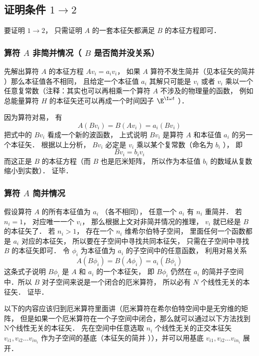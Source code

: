 \subsection{证明条件 $1 \to 2$}
要证明 $1 \to 2$，  只需证明 $A$ 的一套本征矢都满足 $B$ 的本征方程即可．

\subsubsection{算符 $A$ 非简并情况（ $B$ 是否简并没关系）}
先解出算符 $A$ 的本征方程 $A v_i = a_i v_i$，  如果 $A$ 算符不发生简并（见本征矢的简并%
  ）那么本征值各不相同， 且给定一个本征值 $a_i$ 其解只可能是 $v_i$ 或者 $v_i$ 乘以一个任意复常数（注释：其实也可以再相乘一个算符 $A$ 不涉及的物理量的函数， 例如总能量算符 $H$ 的本征矢还可以再成一个时间因子 $\E^{\I\omega t}$ ）．

因为算符对易， 有
\begin{equation}
A (B v_i) = B (A v_i) = a_i (B v_i)
\end{equation}
把式中的 $B v_i$ 看成一个新的波函数， 上式说明 $B v_i$ 是算符 $A$ 和本征值 $a_i$ 的另一个本征矢． 根据以上分析， $B v_i$ 必定是 $v_i$ 乘以某个复常数（命名为 $b_i$ ）， 即
\begin{equation}
B v_i = b_i v_i
\end{equation}
而这正是 $B$ 的本征方程（而 $B$ 也是厄米矩阵， 所以作为本征值 $b_i$ 的数域从复数缩小到实数）． 证毕．

\subsubsection{算符 $A$ 简并情况}
假设算符 $A$ 的所有本征值为 $a_i$ （各不相同）， 任意一个 $a_i$ 有 $n_i$ 重简并． 若 $n_i = 1$，  对应唯一一个 $v_i$，  那么根据上文对非简并情况的推理， $v_i$ 就已经是 $B$ 的本征矢了． 若 $n_i > 1$，  存在一个 $n_i$ 维希尔伯特子空间， 里面任何一个函数都是 $a_i$ 对应的本征矢， 所以要在子空间中寻找共同本征矢， 只需在子空间中寻找 $B$ 的本征矢即可． 令 $\phi_i$ 为本征值为 $a_i$ 的子空间中的任意函数， 利用对易关系
\begin{equation}
A (B \phi_i) = B (A \phi_i) = a_i (B \phi_i)
\end{equation}
这条式子说明 $B \phi_i$ 是 $A$ 和 $a_i$ 的一个本征矢， 即 $B \phi_i$ 仍然在 $a_i$ 的简并子空间中．所以 $B$ 对子空间来说是一个闭合的厄米算符， 所以必有 $N$ 个线性无关的本征矢． 证毕．%

以下的内容应该归到厄米算符里面讲（厄米算符在希尔伯特空间中是无穷维的矩阵， 但是如果一个厄米算符在一个子空间中闭合，那么就可以通过以下方法找到N个线性无关的本征矢．%
先在空间中任意选取 $n_i$ 个线性无关的正交本征矢 $v_{i1}, v_{i2}\dots v_{i n_i}$ 作为子空间的基底（本征矢的简并%
）），并可以用基底 $v_{i1}, v_{i2}\dots v_{i n_i}$ 展开．

